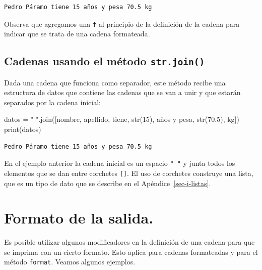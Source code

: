 \documentclass[
  spanish,
  letterpaper,
]{scrbook}
\newenvironment{Shaded}{\begin{snugshade}}{\end{snugshade}}
\newcommand{\BuiltInTok}[1]{\textcolor[rgb]{0.00,0.23,0.31}{#1}}
\newcommand{\DecValTok}[1]{\textcolor[rgb]{0.68,0.00,0.00}{#1}}
\newcommand{\FloatTok}[1]{\textcolor[rgb]{0.68,0.00,0.00}{#1}}
\newcommand{\NormalTok}[1]{\textcolor[rgb]{0.00,0.23,0.31}{#1}}
\newcommand{\OperatorTok}[1]{\textcolor[rgb]{0.37,0.37,0.37}{#1}}
\newcommand{\StringTok}[1]{\textcolor[rgb]{0.13,0.47,0.30}{#1}}
\theoremstyle{definition}
\theoremstyle{remark}
\begin{document}
\begin{verbatim}
Pedro Páramo tiene 15 años y pesa 70.5 kg
\end{verbatim}

Observa que agregamos una \texttt{f} al principio de la definición de la
cadena para indicar que se trata de una cadena formateada.

\subsection{\texorpdfstring{Cadenas usando el método
\texttt{str.join()}}{Cadenas usando el método str.join()}}\label{cadenas-usando-el-muxe9todo-str.join}

Dada una cadena que funciona como separador, este método recibe una
estructura de datos que contiene las cadenas que se van a unir y que
estarán separados por la cadena inicial:

\begin{Shaded}
\begin{Highlighting}[]
\NormalTok{datos }\OperatorTok{=} \StringTok{" "}\NormalTok{.join([nombre, apellido, }\StringTok{\textquotesingle{}tiene\textquotesingle{}}\NormalTok{, }\BuiltInTok{str}\NormalTok{(}\DecValTok{15}\NormalTok{), }\StringTok{\textquotesingle{}años y pesa\textquotesingle{}}\NormalTok{, }\BuiltInTok{str}\NormalTok{(}\FloatTok{70.5}\NormalTok{), }\StringTok{\textquotesingle{}kg\textquotesingle{}}\NormalTok{])}
\BuiltInTok{print}\NormalTok{(datos)}
\end{Highlighting}
\end{Shaded}

\begin{verbatim}
Pedro Páramo tiene 15 años y pesa 70.5 kg
\end{verbatim}

En el ejemplo anterior la cadena inicial es un espacio \texttt{"\ "} y
junta todos los elementos que se dan entre corchetes \texttt{{[}{]}}. El
uso de corchetes construye una lista, que es un tipo de dato que se
describe en el Apéndice~\ref{sec-i-listas}.

\section{Formato de la salida.}\label{formato-de-la-salida.}

Es posible utilizar algunos modificadores en la definición de una cadena
para que se imprima con un cierto formato. Esto aplica para cadenas
formateadas y para el método \texttt{format}. Veamos algunos ejemplos.
\end{document}
